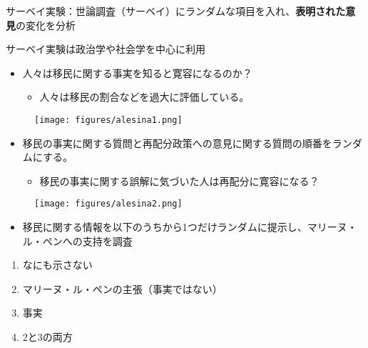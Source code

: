 \documentclass[
  xelatex,
  ja=standard]{bxjsarticle}
\providecommand{\tightlist}{%
  \setlength{\itemsep}{0pt}\setlength{\parskip}{0pt}}\usepackage{longtable,booktabs,array}
\begin{document}
サーベイ実験：世論調査（サーベイ）にランダムな項目を入れ、\textbf{表明された意見}の変化を分析\citep{song2020}

サーベイ実験は政治学や社会学を中心に利用

\begin{itemize}
\tightlist
\item
  人々は移民に関する事実を知ると寛容になるのか？\citep{alesina2023, barrera2020}

  \begin{itemize}
  \tightlist
  \item
    人々は移民の割合などを過大に評価している。
  \end{itemize}
\end{itemize}

\begin{figure}[htpb]

{\centering \texttt{[image: figures/alesina1.png]}

}

\caption{\citet{alesina2023}}

\end{figure}

\begin{itemize}
\tightlist
\item
  移民の事実に関する質問と再配分政策への意見に関する質問の順番をランダムにする。

  \begin{itemize}
  \tightlist
  \item
    移民の事実に関する誤解に気づいた人は再配分に寛容になる？
  \end{itemize}
\end{itemize}

\begin{figure}[htpb]

{\centering \texttt{[image: figures/alesina2.png]}

}

\caption{\citet{alesina2023}}

\end{figure}

\begin{itemize}
\tightlist
\item
  移民に関する情報を以下のうちから1つだけランダムに提示し、マリーヌ・ル・ペンへの支持を調査
\end{itemize}

\begin{enumerate}
\def\labelenumi{\arabic{enumi}.}
\tightlist
\item
  なにも示さない
\item
  マリーヌ・ル・ペンの主張（事実ではない）
\item
  事実
\item
  2と3の両方
\end{enumerate}
\end{document}
